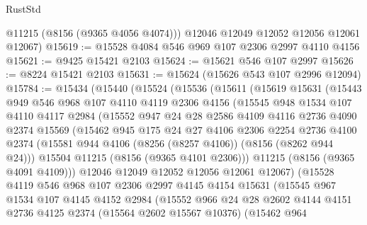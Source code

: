 \begin{lexlean}{RustStd}
\begin{coremodule}
{\begin{coremodule}
{{{{{{{{{{{{{{{{{{{{{{{{{{{{{{{{{{        @11215
        (@8156 (@9365 @4056 @4074)))
      @12046
      @12049
      @12052
      @12056
      @12061
      @12067)
@15619 := @15528 @4084 @546 @969 @107 @2306 @2997 @4110 @4156
@15621 := @9425 @15421 @2103
@15624 := @15621 @546 @107 @2997
@15626 := @8224 @15421 @2103
@15631 := @15624 (@15626 @543 @107 @2996 @12094)
@15784 := @15434
    (@15440
      (@15524
        (@15536
          (@15611
            (@15619
              @15631
              (@15443
                @949
                @546
                @968
                @107
                @4110
                @4119
                @2306
                @4156
                (@15545
                  @948
                  @1534
                  @107
                  @4110
                  @4117
                  @2984
                  (@15552
                    @947
                    @24
                    @28
                    @2586
                    @4109
                    @4116
                    @2736
                    @4090
                    @2374
                    @15569
                    (@15462
                      @945
                      @175
                      @24
                      @27
                      @4106
                      @2306
                      @2254
                      @2736
                      @4100
                      @2374
                      (@15581 @944 @4106 (@8256 (@8257 @4106)) (@8156 (@8262 @944 @24)))
                      @15504
                      @11215
                      (@8156 (@9365 @4101 @2306)))
                    @11215
                    (@8156 (@9365 @4091 @4109)))
                  @12046
                  @12049
                  @12052
                  @12056
                  @12061
                  @12067)
                (@15528
                  @4119
                  @546
                  @968
                  @107
                  @2306
                  @2997
                  @4145
                  @4154
                  @15631
                  (@15545
                    @967
                    @1534
                    @107
                    @4145
                    @4152
                    @2984
                    (@15552
                      @966
                      @24
                      @28
                      @2602
                      @4144
                      @4151
                      @2736
                      @4125
                      @2374
                      (@15564 @2602 @15567 @10376)
                      (@15462
                        @964
}}}}}}}}}}}}}}}}}}}}}}}}}}}}}}}}}}
\end{coremodule}}
\end{coremodule}
\end{lexlean}
